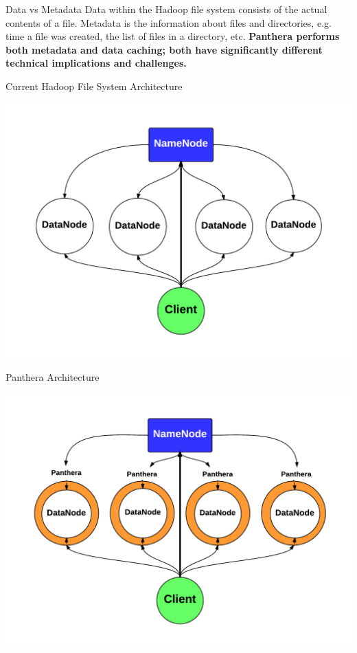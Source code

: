 \documentclass[final]{beamer} %
\begin{document}
\begin{frame}
\begin{columns}[t]
\begin{column}{0.32\textwidth}
		\begin{block}{Data vs Metadata}
			Data within the Hadoop file system consists of the actual contents of a file.
			Metadata is the information about files and directories, e.g. time a file was created, the list of files in a directory, etc. \textbf{Panthera performs both metadata
			and data caching; both have significantly different technical implications
			and challenges.}
		\end{block}
	
		\begin{block}{Current Hadoop File System Architecture}
			\centerline{\includegraphics[scale=1.5]{assets/vanilla_hadoop.pdf}}
		\end{block}
		
	  \begin{block}{Panthera Architecture}
		\centerline{\includegraphics[scale=1.5]{assets/panthera_architecture_complete_larger.pdf}}	  
	  \end{block}



\end{column}
\end{columns}
\end{frame}
\end{document}
